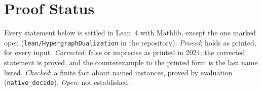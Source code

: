 
\renewcommand{\thefigure}{\arabic{figure}}
\section*{Proof Status}

Every statement below is settled in Lean~4 with Mathlib, except the one marked open (\texttt{lean/HypergraphDualization} in the repository). \emph{Proved}: holds as printed, for every input. \emph{Corrected}: false or imprecise as printed in 2024; the corrected statement is proved, and the counterexample to the printed form is the last name listed. \emph{Checked}: a finite fact about named instances, proved by evaluation (\texttt{native\_decide}). \emph{Open}: not established.

